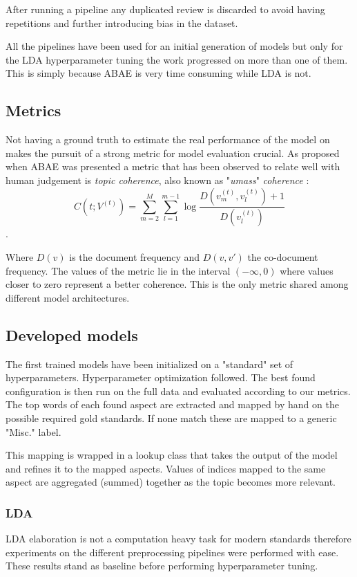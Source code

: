After running a pipeline any duplicated review is discarded to avoid having repetitions and further introducing
bias in the dataset.

All the pipelines have been used for an initial generation of models but only for the LDA hyperparameter
tuning the work progressed on more than one of them. This is simply because ABAE is very time consuming while LDA is not.

\subsection{Metrics}
Not having a ground truth to estimate the real performance of the model on makes the pursuit of a strong metric
for model evaluation crucial.
As proposed when ABAE was presented \cite{he-etal-2017-unsupervised} a metric that has been observed to relate
well with human judgement is \textit{topic coherence}, also known as "\textit{umass}" \textit{coherence} \cite{mimno-etal-2011-optimizing}:
$$C(t;V^{(t)}) = \sum^M_{m=2} \sum^{m-1}_{l=1} \log \frac{D(v_m^{(t)}, v_l^{(t)}) + 1}{D(v_l^{(t)})} $$.

Where $D(v)$ is the document frequency and $D(v,v')$ the co-document frequency.
The values of the metric lie in the interval $(-\infty, 0)$ where values closer to zero represent a better coherence.
This is the only metric shared among different model architectures.

\subsection{Developed models}
The first trained models have been initialized on a "standard" set of hyperparameters.
Hyperparameter optimization followed.
The best found configuration is then run on the full data and evaluated according to our metrics.
The top words of each found aspect are extracted and mapped by hand on the possible required gold standards.
If none match these are mapped to a generic "Misc." label.

This mapping is wrapped in a lookup class that takes the output of the model and refines it to the mapped aspects.
Values of indices mapped to the same aspect are aggregated (summed) together as the topic becomes more relevant.

\subsubsection{LDA}
LDA elaboration is not a computation heavy task for modern standards therefore experiments on the different
preprocessing pipelines were performed with ease.
These results stand as baseline before performing hyperparameter tuning.

